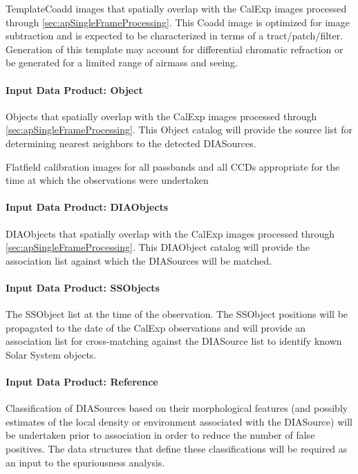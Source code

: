 TemplateCoadd images that spatially overlap with the CalExp images processed through \ref{sec:apSingleFrameProcessing}. This Coadd image is optimized for image subtraction and is expected to be characterized in terms of a tract/patch/filter. Generation of this template may account for differential chromatic refraction or be generated for a limited range of airmass and seeing.

\paragraph{Input Data Product: Object}

Objects that spatially overlap with the CalExp images processed through \ref{sec:apSingleFrameProcessing}. This Object catalog will provide the source list for determining nearest neighbors to the detected DIASources. 

Flatfield calibration images for all passbands and all CCDs appropriate for the time at which the observations were undertaken 

\paragraph{Input Data Product: DIAObjects}

DIAObjects that spatially overlap with the CalExp images processed through \ref{sec:apSingleFrameProcessing}. This DIAObject catalog will provide the association  list against which the DIASources will be matched. 

\paragraph{Input Data Product: SSObjects}

The SSObject list at the time of the observation. The SSObject positions will be propagated to the date of the CalExp observations and will provide an association  list for cross-matching against the DIASource list to identify known Solar System objects.

\paragraph{Input Data Product: Reference}

Classification of DIASources based on their morphological features (and possibly estimates of the local density or  environment associated with the DIASource) will be undertaken prior to association in order to reduce the number of false positives. The data structures that define these classifications will be required as an input to the spuriousness analysis. 


